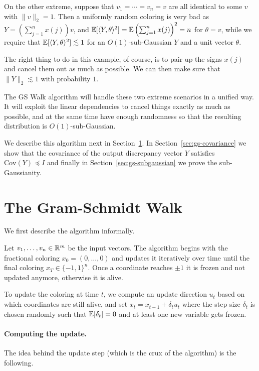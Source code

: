  \begin{example}
 \label{ex:gs-2}
On the other extreme, suppose that $v_1 = \cdots = v_n =v $ are all
identical to some $v$ with $\|v\|_2=1$. Then a uniformly random
coloring is  very bad as $Y = \left(\sum_{j=1}^n x(j)\right) v$, and
\(
  \mathbb{E} [\langle Y,\theta\rangle^2] = \mathbb{E}\left(\sum_{j=1}^n x(j)\right)^2 = n
\)
for
$\theta =v$, while we require that $\mathbb{E} [\langle Y,\theta\rangle^2] \lesssim
1$ for an $O(1)$-sub-Gaussian $Y$ and a unit vector $\theta$.

The right thing to do in this example, of course, is to pair up the
signs $x(j)$ and cancel them out as much as possible. We can
then make sure that $\|Y\|_2 \lesssim 1$ with probability $1$.
\end{example}

The GS Walk algorithm will handle these two extreme scenarios in a unified way. It will exploit the linear dependencies to cancel things exactly as much as possible, and at the same time have enough randomness so that  the resulting distribution is $O(1)$-sub-Gaussian.

We describe this algorithm next in Section~\ref{sec:gs:algorithm}.
In Section~\ref{sec:gs-covariance} we show that the covariance of the output discrepancy vector $Y$ satisfies $\text{Cov}(Y) \preceq I$ and finally in Section~\ref{sec:gs-subgaussian} we prove the sub-Gaussianity.

\section{The Gram-Schmidt Walk}
\label{sec:gs:algorithm}
We first describe the algorithm informally.

Let $v_1,\ldots,v_n \in \mathbb{R}^m$ be the input vectors. The algorithm begins with the fractional coloring $x_0 =(0,\ldots,0)$ and updates it iteratively over time until the final coloring $x_T \in \{-1,1\}^n$. Once  a coordinate reaches $\pm 1$ it is frozen and not updated anymore, otherwise it is alive.

To update the coloring at time $t$, we compute an update direction
$u_t$ based on which coordinates are still alive, and set $x_t = x_{t-1} + \delta_t u_t$ where the step size $\delta_t$ is chosen randomly such that $\mathbb{E}[\delta_t]=0$ and at least one new variable gets frozen.

\paragraph{Computing the update.} The idea behind the update step (which is the crux of the algorithm) is the following. 

